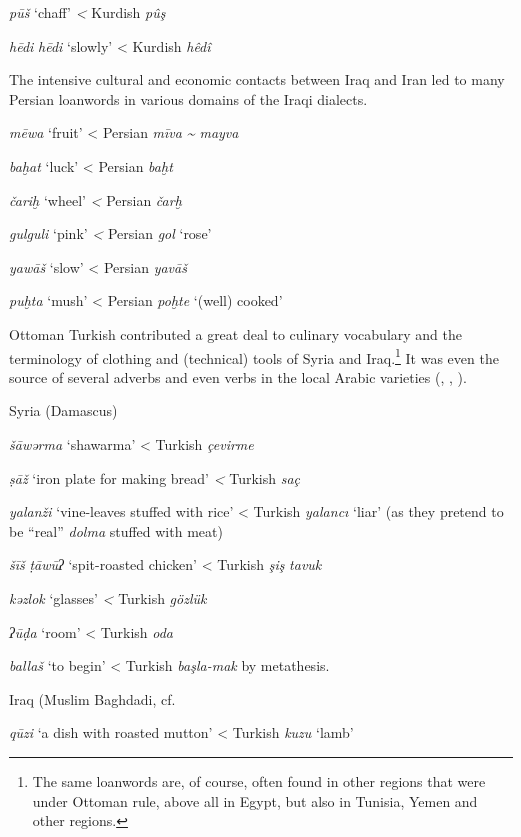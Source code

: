 \documentclass[output=paper]{langsci/langscibook}
\begin{document}
\textit{pūš} ‘chaff’ \textit{<} Kurdish \textit{pûş}

\textit{hēdi} \textit{hēdi} ‘slowly’ < Kurdish \textit{hêdî} \citep[68]{Jastrow1979}
\z

The intensive cultural and economic contacts between Iraq and Iran led to many Persian loanwords in various domains of the Iraqi dialects. 

\ea
\textit{mēwa} ‘fruit’ < Persian \textit{mīva} \textit{{\textasciitilde} mayva}

\textit{baḫat} ‘luck’ < Persian \textit{baḫt}

\textit{čariḫ} ‘wheel’ \textit{<} Persian \textit{čarḫ} 

\textit{gulguli} ‘pink’ \textit{<} Persian \textit{gol} ‘rose’

\textit{yawāš} ‘slow’ < Persian \textit{yavāš}

\textit{puḫta} ‘mush’ < Persian \textit{poḫte} ‘(well) cooked’
\z

Ottoman Turkish contributed a great deal to culinary vocabulary and the terminology of clothing and (technical) tools of Syria and Iraq.\footnote{The same loanwords are, of course, often found in other regions that were under Ottoman rule, above all in Egypt, but also in Tunisia, Yemen and other regions.} It was even the source of several adverbs and even verbs in the local Arabic varieties (\citealt{Halasi-Kun1969}, \citeyear{Halasi-Kun1973}, \citeyear{Halasi-Kun1982}).

\ea
Syria (Damascus)

\textit{šāwərma} ‘shawarma’ < Turkish \textit{çevirme} 

\textit{ṣāž} ‘iron plate for making bread’ \textit{<} Turkish \textit{saç}

\textit{yalanži} ‘vine-leaves stuffed with rice’ < Turkish \textit{yalancı} ‘liar’ (as they pretend to be “real” \textit{dolma} stuffed with meat)

\textit{šīš} \textit{ṭāwūʔ} ‘spit-roasted chicken’ < Turkish \textit{şiş} \textit{tavuk}

\textit{kǝzlok} ‘glasses’ \textit{<} Turkish \textit{gözlük}

\textit{ʔūḍa} ‘room’ < Turkish \textit{oda}

\textit{ballaš} ‘to begin’ < Turkish \textit{başla-mak} by metathesis.
\z

\ea
Iraq (Muslim Baghdadi, cf. \citealt{Reinkowski1995} 

\textit{qūzi} ‘a dish with roasted mutton’ < Turkish \textit{kuzu} ‘lamb’
\end{document}
